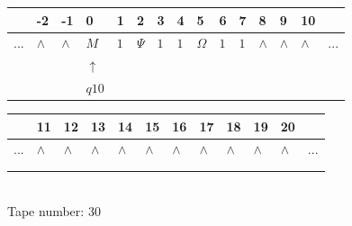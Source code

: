\documentclass[11pt]{article}
\begin{document}
\begin{table}[H]
\centering
\begin{tabular}{lllllllllllllll}
 & -2 & -1 & 0 & 1 & 2 & 3 & 4 & 5 & 6 & 7 & 8 & 9 & 10 & \\
\hline
$...$ & \multicolumn{1}{|l|}{$\wedge$} & \multicolumn{1}{|l|}{$\wedge$} & \multicolumn{1}{|l|}{$M$} & \multicolumn{1}{|l|}{$1$} & \multicolumn{1}{|l|}{$\Psi$} & \multicolumn{1}{|l|}{$1$} & \multicolumn{1}{|l|}{$1$} & \multicolumn{1}{|l|}{$\Omega$} & \multicolumn{1}{|l|}{$1$} & \multicolumn{1}{|l|}{$1$} & \multicolumn{1}{|l|}{$\wedge$} & \multicolumn{1}{|l|}{$\wedge$} & \multicolumn{1}{|l|}{$\wedge$} & $...$\\
\hline
&  &  & $\uparrow$ &  &  &  &  &  &  &  &  &  &  &  \\
&  &  & $ q10 $ &  &  &  &  &  &  &  &  &  &  &  \\
\end{tabular}
\begin{tabular}{llllllllllll}
 & 11 & 12 & 13 & 14 & 15 & 16 & 17 & 18 & 19 & 20 & \\
\hline
$...$ & \multicolumn{1}{|l|}{$\wedge$} & \multicolumn{1}{|l|}{$\wedge$} & \multicolumn{1}{|l|}{$\wedge$} & \multicolumn{1}{|l|}{$\wedge$} & \multicolumn{1}{|l|}{$\wedge$} & \multicolumn{1}{|l|}{$\wedge$} & \multicolumn{1}{|l|}{$\wedge$} & \multicolumn{1}{|l|}{$\wedge$} & \multicolumn{1}{|l|}{$\wedge$} & \multicolumn{1}{|l|}{$\wedge$} & $...$\\
\hline
&  &  &  &  &  &  &  &  &  &  &  \\
&  &  &  &  &  &  &  &  &  &  &  \\
\end{tabular}
\\
Tape number: 30
\noindent\makebox[\linewidth]{\hdashrule{\textwidth}{1pt}{1pt}}\end{table}
\end{document}
